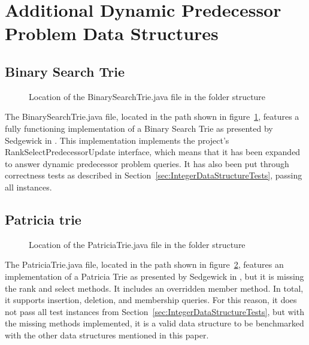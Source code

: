 \section{Additional Dynamic Predecessor Problem Data Structures}

\subsection{Binary Search Trie}

\begin{figure}[H]
\caption{Location of the {\ttfamily BinarySearchTrie.java} file in the folder structure}
\label{fig:BinarySearchTrieTree}
\end{figure}

The {\ttfamily BinarySearchTrie.java} file, located in the path shown in figure~\ref{fig:BinarySearchTrieTree}, features a fully functioning implementation of a Binary Search Trie as presented by Sedgewick in \cite{sedgewick2002algorithms}. This implementation implements the project's {\ttfamily RankSelectPredecessorUpdate} interface, which means that it has been expanded to answer dynamic predecessor problem queries. It has also been put through correctness tests as described in Section~\ref{sec:IntegerDataStructureTests}, passing all instances.

\subsection{Patricia trie} \label{sec:PatriciaTrieImplementation}

\begin{figure}[H]
\caption{Location of the {\ttfamily PatriciaTrie.java} file in the folder structure}
\label{fig:PatriciaTrieTree}
\end{figure}

The {\ttfamily PatriciaTrie.java} file, located in the path shown in figure~\ref{fig:PatriciaTrieTree}, features an implementation of a Patricia Trie as presented by Sedgewick in \cite{sedgewick2002algorithms}, but it is missing the {\ttfamily rank} and {\ttfamily select} methods. It includes an overridden {\ttfamily member} method. In total, it supports insertion, deletion, and membership queries. For this reason, it does not pass all test instances from Section~\ref{sec:IntegerDataStructureTests}, but with the missing methods implemented, it is a valid data structure to be benchmarked with the other data structures mentioned in this paper.

